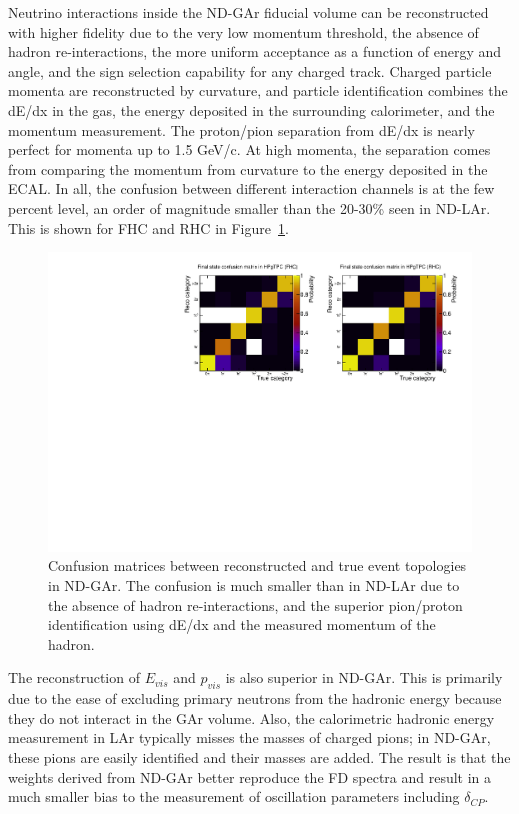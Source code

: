 \documentclass[11pt]{article}
\begin{document}
Neutrino interactions inside the ND-GAr fiducial volume can be reconstructed with higher fidelity due to the very low momentum threshold, the absence of hadron re-interactions, the more uniform acceptance as a function of energy and angle, and the sign selection capability for any charged track. Charged particle momenta are reconstructed by curvature, and particle identification combines the dE/dx in the gas, the energy deposited in the surrounding calorimeter, and the momentum measurement. The proton/pion separation from dE/dx is nearly perfect for momenta up to 1.5 GeV/c. At high momenta, the separation comes from comparing the momentum from curvature to the energy deposited in the ECAL. In all, the confusion between different interaction channels is at the few percent level, an order of magnitude smaller than the 20-30\% seen in ND-LAr. This is shown for FHC and RHC in Figure~\ref{fig:gar_matrices}.

\begin{figure}[h]
\centering
\includegraphics[width=0.9\columnwidth]{graphics/PiStudyConfusionMatrixBoth.pdf}
\caption{Confusion matrices between reconstructed and true event topologies in ND-GAr. The confusion is much smaller than in ND-LAr due to the absence of hadron re-interactions, and the superior pion/proton identification using dE/dx and the measured momentum of the hadron.}
\label{fig:gar_matrices}
\end{figure}

The reconstruction of $E_{vis}$ and $p_{vis}$ is also superior in ND-GAr. This is primarily due to the ease of excluding primary neutrons from the hadronic energy because they do not interact in the GAr volume. Also, the calorimetric hadronic energy measurement in LAr typically misses the masses of charged pions; in ND-GAr, these pions are easily identified and their masses are added. The result is that the weights derived from ND-GAr better reproduce the FD spectra and result in a much smaller bias to the measurement of oscillation parameters including $\delta_{CP}$.
\end{document}
